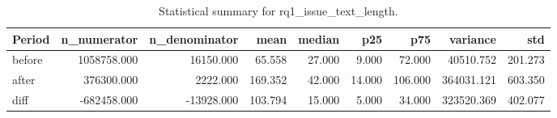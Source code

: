 \begin{table}[h]
\centering
\begin{tabular}{lrrrrrrrr}
\toprule
Period & n_numerator & n_denominator & mean & median & p25 & p75 & variance & std \\
\midrule
before & 1058758.000 & 16150.000 & 65.558 & 27.000 & 9.000 & 72.000 & 40510.752 & 201.273 \\
after & 376300.000 & 2222.000 & 169.352 & 42.000 & 14.000 & 106.000 & 364031.121 & 603.350 \\
diff & -682458.000 & -13928.000 & 103.794 & 15.000 & 5.000 & 34.000 & 323520.369 & 402.077 \\
\bottomrule
\end{tabular}
\caption{Statistical summary for rq1_issue_text_length.}\label{tab:rq1_issue_text_length}
\end{table}
